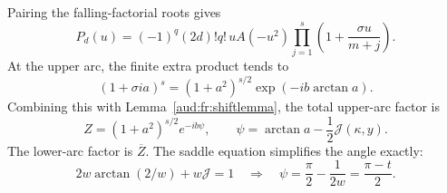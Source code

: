 \documentclass[11pt,a4paper]{article}
\numberwithin{equation}{section}
\begin{document}
Pairing the falling-factorial roots gives
\begin{equation}\label{aud:fr:paired}
 P_d(u)=(-1)^q(2d)!q!\,u A(-u^2)
 \prod_{j=1}^s\left(1+\frac{\sigma u}{m+j}\right).
\end{equation}
At the upper arc, the finite extra product tends to
\[
 (1+\sigma ia)^s=(1+a^2)^{s/2}\exp(-ib\arctan a).
\]
Combining this with Lemma~\ref{aud:fr:shiftlemma}, the total upper-arc factor is
\begin{equation}\label{aud:fr:upperfactor}
 Z=(1+a^2)^{s/2}e^{-ib\psi},\qquad
 \psi=\arctan a-\frac12\mathcal J(\kappa,y).
\end{equation}
The lower-arc factor is $\overline Z$. The saddle equation simplifies the angle exactly:
\begin{equation}\label{aud:fr:psiexact}
 2w\arctan(2/w)+w\mathcal J=1
 \quad\Longrightarrow\quad
 \psi=\frac\pi2-\frac1{2w}=\frac{\pi-t}2.
\end{equation}
\end{document}
